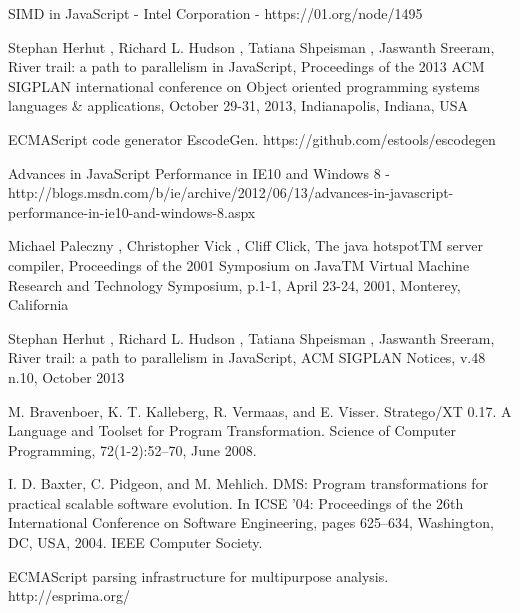 \documentclass[preprint,10pt]{sigplanconf}
\begin{document}
\begin{thebibliography}{}
\bibitem{} SIMD in JavaScript - Intel Corporation - https://01.org/node/1495

\bibitem{} Stephan Herhut , Richard L. Hudson , Tatiana Shpeisman , Jaswanth Sreeram, River trail: a path to parallelism in JavaScript, Proceedings of the 2013 ACM SIGPLAN international conference on Object oriented programming systems languages \& applications, October 29-31, 2013, Indianapolis, Indiana, USA

\bibitem{} ECMAScript code generator EscodeGen. https://github.com/estools/escodegen

\bibitem{} Advances in JavaScript Performance in IE10 and Windows 8 - http://blogs.msdn.com/b/ie/archive/2012/06/13/advances-in-javascript-performance-in-ie10-and-windows-8.aspx

\bibitem{} Michael Paleczny , Christopher Vick , Cliff Click, The java hotspotTM server compiler, Proceedings of the 2001 Symposium on JavaTM Virtual Machine Research and Technology Symposium, p.1-1, April 23-24, 2001, Monterey, California

\bibitem{} Stephan Herhut , Richard L. Hudson , Tatiana Shpeisman , Jaswanth Sreeram, River trail: a path to parallelism in JavaScript, ACM SIGPLAN Notices, v.48 n.10, October 2013

\bibitem{} M. Bravenboer, K. T. Kalleberg, R. Vermaas, and E. Visser. Stratego/XT 0.17. A Language and Toolset for Program Transformation. Science of Computer Programming, 72(1-2):52--70, June 2008.

\bibitem{} I. D. Baxter, C. Pidgeon, and M. Mehlich. DMS: Program transformations for practical scalable software evolution. In ICSE ’04: Proceedings of the 26th International Conference on Software Engineering, pages 625–634, Washington, DC, USA, 2004. IEEE Computer Society.

\bibitem{} ECMAScript parsing infrastructure for multipurpose analysis. http://esprima.org/

\end{thebibliography}
\end{document}

